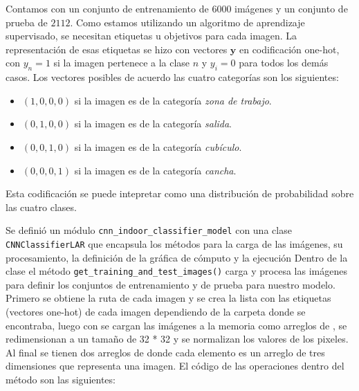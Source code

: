 Contamos con un conjunto de entrenamiento de $6000$ imágenes y 
un conjunto de prueba de $2112$.
Como estamos utilizando un algoritmo de aprendizaje supervisado, 
se necesitan etiquetas u objetivos para cada imagen. La representación
de esas etiquetas se hizo con vectores $\mathbf{y}$ en codificación one-hot,
con $y_n = 1$ si la imagen pertenece a la clase $n$ y $y_i = 0$ para todos los
demás casos. Los vectores posibles de acuerdo las cuatro categorías son los siguientes:

\begin{itemize}
\item $(1, 0, 0, 0)$ si la imagen es de la categoría \textit{zona de trabajo}.
\item $(0, 1, 0, 0)$ si la imagen es de la categoría \textit{salida}.
\item $(0, 0, 1, 0)$ si la imagen es de la categoría \textit{cubículo}.
\item $(0, 0, 0, 1)$ si la imagen es de la categoría \textit{cancha}.
\end{itemize}

Esta codificación se puede intepretar como una distribución de probabilidad
sobre las cuatro clases.

Se definió un módulo \texttt{cnn\_indoor\_classifier\_model} con 
una clase \texttt{CNNClassifierLAR}
que encapsula los métodos para la carga de las imágenes, su 
procesamiento, la definición de la gráfica de cómputo y la ejecución 
Dentro de la clase el método \texttt{get\_training\_and\_test\_images()}
carga y procesa las imágenes para definir los conjuntos de entrenamiento
y de prueba para nuestro modelo.
Primero se obtiene la ruta de cada imagen y se crea la lista con las etiquetas
(vectores one-hot)
de cada imagen dependiendo de la carpeta donde se encontraba, luego con
 se cargan las imágenes a la memoria como arreglos de
, se redimensionan a un tamaño de 32 * 32 y se normalizan
los valores de los pixeles. Al final se tienen dos arreglos de 
donde cada elemento es un arreglo de tres dimensiones que
representa una imagen. El código de las operaciones dentro del método
son las siguientes:

